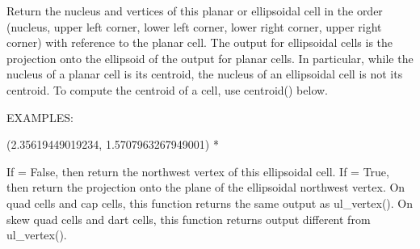 \documentclass[a4paper,12ptopenany,oneside,english]{sphinxmanual}
\begin{document}
\begin{fulllineitems}
\begin{fulllineitems}
\end{fulllineitems}


\begin{fulllineitems}
\label{\detokenize{dggs:rhealpixdggs.dggs.Cell.nucleus}}
\pysigstartsignatures
{}
\pysigstopsignatures
\sphinxAtStartPar
Return the nucleus and vertices of this planar or ellipsoidal cell
in the order (nucleus, upper left corner, lower left corner,
lower right corner, upper right corner) with reference to the
planar cell.
The output for ellipsoidal cells is the projection onto the ellipsoid
of the output for planar cells.  In particular, while the
nucleus of a planar cell is its centroid, the nucleus
of an ellipsoidal cell is not its centroid.
To compute the centroid of a cell, use centroid() below.

\sphinxAtStartPar
EXAMPLES:

\begin{sphinxVerbatim}[commandchars=\\\{\}]
  
  \PYG{p}{[}\PYG{p}{]}
 
\end{sphinxVerbatim}
\begin{description}
\sphinxAtStartPar
(\sphinxhyphen{}2.35619449019234, 1.5707963267949001) *

\end{description}

\end{fulllineitems}


\begin{fulllineitems}
\label{\detokenize{dggs:rhealpixdggs.dggs.Cell.nw_vertex}}
\pysigstartsignatures
{}
\pysigstopsignatures
\sphinxAtStartPar
If  = False, then return the northwest vertex of this
ellipsoidal cell.
If  = True, then return the projection onto the plane
of the ellipsoidal northwest vertex.
On quad cells and cap cells, this function returns the same output
as ul\_vertex().
On skew quad cells and dart cells, this function returns output
different from ul\_vertex().


\end{fulllineitems}
\end{fulllineitems}
\end{document}
